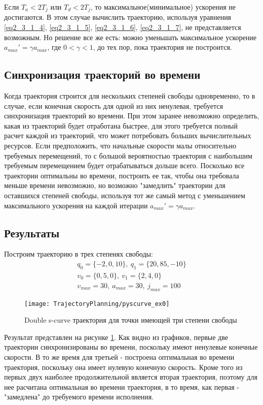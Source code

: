	Если $T_{a} < 2T_{j}$ или $T_{d} < 2T_{j}$, то максимальное(минимальное) ускорения не достигаются. В этом случае вычислить траекторию, используя уравнения \ref{eq2_3_1_4}, \ref{eq2_3_1_5}, \ref{eq2_3_1_6}, \ref{eq2_3_1_7}, не представляется возможным. Но решение все же есть: можно уменьшать максимальное ускорение $a_{max}' = \gamma a_{max}$, где $0 < \gamma < 1$, до тех пор, пока траектория не построится.
	
\subsection{Синхронизация траекторий во времени} \label{subsect2_3_2}
Когда траектория строится для нескольких степеней свободы одновременно, то в случае, если конечная скорость для одной из них ненулевая, требуется синхронизация траекторий во времени. При этом заранее невозможно определить, какая из траекторий будет отработана быстрее, для этого требуется полный расчет каждой из траекторий, что может потребовать больших вычислительных ресурсов. Если предположить, что начальные скорости малы относительно требуемых перемещений, то с большой вероятностью траектория с наибольшим требуемым перемещением будет отрабатываться дольше всего. Посколько все траектории оптимальны во времени, построить ее так, чтобы она требовала меньше времени невозможно, но возможно "замедлить" траектории для оставшихся степеней свободы, используя тот же самый метод с уменьшением максимального ускорения на каждой итерации $a_{max}' = \gamma a_{max}$.

\subsection{Результаты} \label{subsect2_3_3}
Построим траекторию в трех степенях свободы:
\begin{align*}
	q_{0} = \{-2, 0, 10\},\ q_{1} = \{20, 85, -10\}\\
	v_{0} = \{0, 5, 0\},\ v_{1} = \{2, 4, 0\}\\
	v_{max} = 30,\ a_{max} = 30,\ j_{max} = 100
\end{align*} 

\begin{figure}[ht]
	\centering
	\texttt{[image: TrajectoryPlanning/pyscurve\_ex0]}
	\caption{Double s-curve траектория для точки имеющей три степени свободы}
	\label{fig:pyscurve_ex0}
\end{figure}

Результат представлен на рисунке \ref{fig:pyscurve_ex0}.
Как видно из графиков, первые две траектории синхронизированы во времени, поскольку имеют ненулевые конечные скорости. В то же время для третьей - построена оптимальная во времени траектория, поскольку она имеет нулевую конечную скорость. Кроме того из первых двух наиболее продолжительной является вторая траектория, поэтому для нее расчитана оптимальная во времени траектория, в то время, как первая - "замедлена" до требуемого времени исполнения.
